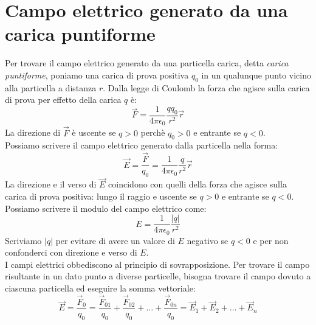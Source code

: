 \documentclass[12pt]{report}
\begin{document}
	\section{Campo elettrico generato da una carica puntiforme}
	Per trovare il campo elettrico generato da una particella carica, detta \textit{carica puntiforme}, poniamo una carica di prova positiva $q_0$ in un qualunque punto vicino alla particella a distanza $r$. Dalla legge di Coulomb la forza che agisce sulla carica di prova per effetto della carica $q$ è:
	\[
	\vec{F} = \frac{1}{4\pi\epsilon_0}\frac{qq_0}{r^2}\vec{r}
	\]
	La direzione di $\vec{F}$ è uscente se $q > 0$ perchè $q_0 > 0$ e entrante se $q < 0$. \\
	Possiamo scrivere il campo elettrico generato dalla particella nella forma:
	\[\vec{E} = \frac{\vec{F}}{q_0} = \frac{1}{4\pi\epsilon_0}\frac{q}{r^2}\vec{r}\]
	La direzione e il verso di $\vec{E}$ coincidono con quelli della forza che agisce sulla carica di prova positiva: lungo il raggio e uscente se $q > 0$ e entrante se $q < 0$. \\
	Possiamo scrivere il modulo del campo elettrico come:
	\[
	E = \frac{1}{4\pi\epsilon_0}\frac{|q|}{r^2}
	\]
	Scriviamo $|q|$ per evitare di avere un valore di $E$ negativo se $q<0$ e per non confonderci con direzione e verso di $E$. \\
	I campi elettrici obbediscono al principio di sovrapposizione. Per trovare il campo risultante in un dato punto a diverse particelle, bisogna trovare il campo dovuto a ciascuna particella ed eseguire la somma vettoriale:
	\[
	\vec{E} = \frac{\vec{F}_0}{q_0} = \frac{\vec{F}_{01}}{q_0} + \frac{\vec{F}_{02}}{q_0} + \dots + \frac{\vec{F}_{0n}}{q_0} = \vec{E}_1 + \vec{E}_2 + \dots + \vec{E}_n
	\]
\end{document}
